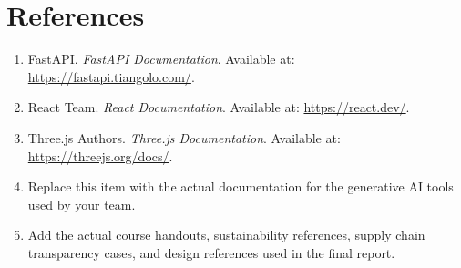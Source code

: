 \documentclass[11pt]{article}
\begin{document}
\section*{References}
\begin{enumerate}[leftmargin=2.2em]
    \item FastAPI. \emph{FastAPI Documentation}. Available at: \url{https://fastapi.tiangolo.com/}.
    \item React Team. \emph{React Documentation}. Available at: \url{https://react.dev/}.
    \item Three.js Authors. \emph{Three.js Documentation}. Available at: \url{https://threejs.org/docs/}.
    \item Replace this item with the actual documentation for the generative AI tools used by your team.
    \item Add the actual course handouts, sustainability references, supply chain transparency cases, and design references used in the final report.
\end{enumerate}
\end{document}
